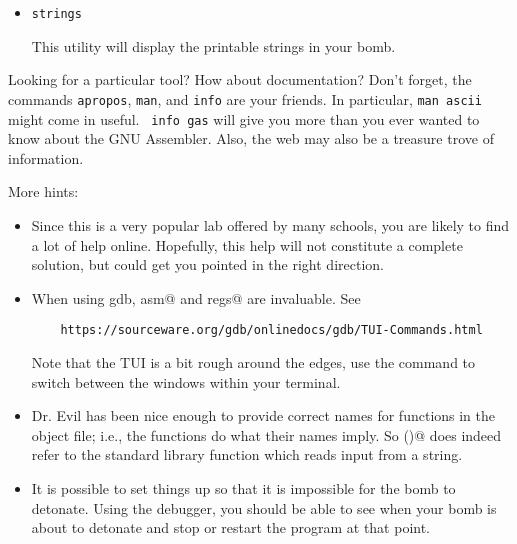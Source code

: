 \documentclass[11pt]{article}
\begin{document}
\begin{itemize}
\item {\tt strings }

This utility will display the printable strings in your bomb.



\end{itemize}

Looking for a particular tool?  How about documentation?  Don't
forget, the commands {\tt apropos}, {\tt man}, and {\tt info} are your
friends.  In particular, {\tt man ascii} might come in useful. {\tt
  info gas} will give you more than you ever wanted to know about the
GNU Assembler. Also, the web may also be a treasure trove of
information.

More hints:

\begin{itemize}
\item Since this is a very popular lab offered by many schools, you
  are likely to find a lot of help online.  Hopefully, this help will
  not constitute a complete solution, but could get you pointed in the
  right direction.

\item When using gdb, \verb@layout asm@ and \verb@layout regs@ are
  invaluable.  See

  \begin{verbatim}
    https://sourceware.org/gdb/onlinedocs/gdb/TUI-Commands.html
  \end{verbatim}

  Note that the TUI is a bit rough around the edges, use the
  \verb@focus@ command to switch between the windows within your
  terminal.

\item Dr. Evil has been nice enough to provide correct names for functions
  in the object file; i.e., the functions do what their names imply.  So
  \verb@sscanf()@ does indeed refer to the standard library function
  which reads input from a string.

\item It is possible to set things up so that it is impossible for the
  bomb to detonate.  Using the debugger, you should be able to see
  when your bomb is about to detonate and stop or restart the program
  at that point.
\end{itemize}
\end{document}
